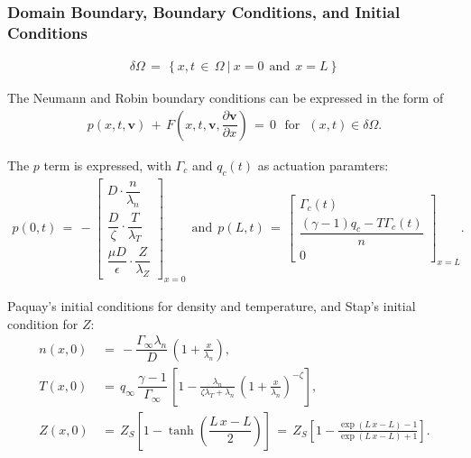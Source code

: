 \documentclass[a4paper,10pt]{article}
\begin{document}
\hypertarget{domain-boundary-boundary-conditions-and-initial-conditions}{%
\subsubsection{Domain Boundary, Boundary Conditions, and Initial
Conditions}\label{domain-boundary-boundary-conditions-and-initial-conditions}}

\begin{align}
    \delta \Omega \,=\, \left\{x, t \,\in\, \Omega ~|~ x = 0 ~~\text{and}~~ x = L\right\}
\end{align}

The Neumann and Robin boundary conditions can be expressed in the form
of \begin{align}
    p\left(x, t, \mathbf{v}\right) \,+\, F\left(x, t, \mathbf{v}, \dfrac{\partial\mathbf{v}}{\partial x}\right) \,=\, 0 ~~~ \text{for} ~~~ (x, t) \in \delta\Omega.
\end{align}

The \(p\) term is expressed, with \(\Gamma_c\) and \(q_c(t)\) as
actuation paramters: \begin{align}
p(0, t) \,=\, -\begin{bmatrix}
                D \cdot \dfrac{n}{\lambda_n}\\[2ex]
                \dfrac{D}{\zeta} \cdot \dfrac{T}{\lambda_T} \\[2ex]
                \dfrac{\mu D}{\epsilon} \cdot \dfrac{Z}{\lambda_Z}
                \end{bmatrix}_{x = 0}
~~ \text{and} ~~
p(L, t) \,=\, \begin{bmatrix}
                \Gamma_c(t) \\[1ex]
                \dfrac{(\gamma - 1) q_c - T\Gamma_c(t)}{n} \\[2ex]
                0
                \end{bmatrix}_{x = L}.
\end{align}

Paquay's initial conditions for density and temperature, and Stap's
initial condition for \(Z\): \begin{align}
    n(x,0) \,&=\, -\dfrac{\Gamma_\infty \lambda_n}{D} \, \left(1 + \frac{x}{\lambda_n}\right), \\
    T(x,0) \,&=\, q_\infty \, \dfrac{\gamma - 1}{\Gamma_\infty} \, \left[1 - \frac{\lambda_n}{\zeta \lambda_T + \lambda_n} \, \left(1 + \frac{x}{\lambda_n}\right)^{-\zeta}\right], \\
    Z(x,0) \,&=\, Z_S\left[1 - \tanh\left(\dfrac{L\,x - L}{2}\right)\right] \,=\, Z_S\left[1 - \frac{\exp(L\,x - L) - 1}{\exp(L\,x - L) + 1}\right].
\end{align}
\end{document}

